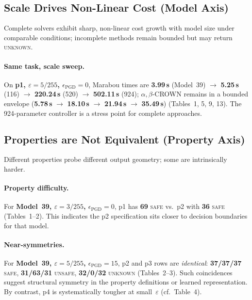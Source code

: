 \subsection{Scale Drives Non-Linear Cost (Model Axis)}
Complete solvers exhibit sharp, non-linear cost growth with model size under comparable conditions; incomplete methods remain bounded but may return \textsc{unknown}.

\paragraph{Same task, scale sweep.}
On \textbf{p1, $\varepsilon{=}5/255$, $\epsilon_{\mathrm{PGD}}{=}0$}, Marabou times are \textbf{3.99\,s} (Model~39) $\rightarrow$ \textbf{5.25\,s} (116) $\rightarrow$ \textbf{220.24\,s} (520) $\rightarrow$ \textbf{502.11\,s} (924); $\alpha,\beta$-CROWN remains in a bounded envelope (\textbf{5.78\,s} $\rightarrow$ \textbf{18.10\,s} $\rightarrow$ \textbf{21.94\,s} $\rightarrow$ \textbf{35.49\,s}) (Tables~1, 5, 9, 13). The 924-parameter controller is a stress point for complete approaches.

\subsection{Properties are Not Equivalent (Property Axis)}
Different properties probe different output geometry; some are intrinsically harder.

\paragraph{Property difficulty.}
For \textbf{Model~39, $\varepsilon{=}3/255$, $\epsilon_{\mathrm{PGD}}{=}0$}, p1 has \textbf{69} \textsc{safe} vs.\ p2 with \textbf{36} \textsc{safe} (Tables~1--2). This indicates the p2 specification sits closer to decision boundaries for that model.

\paragraph{Near-symmetries.}
For \textbf{Model~39, $\varepsilon{=}5/255$, $\epsilon_{\mathrm{PGD}}{=}15$}, p2 and p3 rows are \emph{identical}: \textbf{37/37/37} \textsc{safe}, \textbf{31/63/31} \textsc{unsafe}, \textbf{32/0/32} \textsc{unknown} (Tables~2--3). Such coincidences suggest structural symmetry in the property definitions or learned representation. By contrast, p4 is systematically tougher at small~$\varepsilon$ (cf.\ Table~4).

